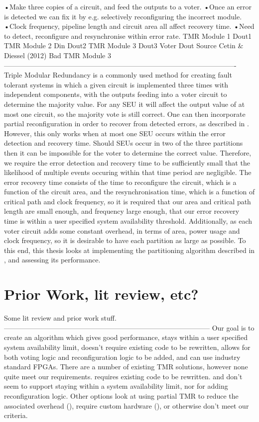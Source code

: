 \documentclass[12pt,draft,a4paper,oneside]{memoir} %
\begin{document}
•Make three copies of a circuit, and feed the outputs to a voter.
•Once an error is detected we can fix it by e.g. selectively reconfiguring the incorrect module.
•Clock frequency, pipeline length and circuit area all affect recovery time.
•Need to detect, reconfigure and resynchronise within error rate.
TMR Module 1
Dout1
TMR Module 2
Din
Dout2
TMR Module 3
Dout3
Voter
Dout
Source Cetin \& Diessel (2012)
Bad
TMR Module 3
----------------------------------------------------------------------------------------------------
Triple Modular Redundancy is a commonly used method for creating fault tolerant systems in which a given circuit is implemented three times with independent components, with the outputs feeding into a voter circuit to determine the majority value. For any \ac{SEU} it will affect the output value of at most one circuit, so the majority vote is still correct. One can then incorporate partial reconfiguration in order to recover from detected errors, as described in . However, this only works when at most one \ac{SEU} occurs within the error detection and recovery time. Should \acp{SEU} occur in two of the three partitions then it can be impossible for the voter to determine the correct value. Therefore, we require the error detection and recovery time to be sufficiently small that the likelihood of multiple events occuring within that time period are negligible.
The error recovery time consists of the time to reconfigure the circuit, which is a function of the circuit area, and the resynchronisation time, which is a function of critical path and clock frequency, so it is required that our area and critical path length are small enough, and frequency large enough, that our error recovery time is within a user specified system availability threshold.
Additionally, as each voter circuit adds some constant overhead, in terms of area, power usage and clock frequency, so it is desirable to have each partition as large as possible. To this end, this thesis looks at implementing the partitioning algorithm described in , and assessing its performance.
\section{Prior Work, lit review, etc?}
Some lit review and prior work stuff.
-----------------------------------------------------------------------------------------
Our goal is to create an algorithm which gives good performance, stays within a user specified system availability limit, doesn't require existing code to be rewritten, allows for both voting logic and reconfiguration logic to be added, and can use industry standard \acp{FPGA}. There are a number of existing \ac{TMR} solutions, however none quite meet our requirements.
\cite{ftmr} requires existing code to be rewritten.
\cite{synplify} and \cite{tmrtool} don't seem to support staying within a system availability limit, nor for adding reconfiguration logic.
Other options look at using partial \ac{TMR} to reduce the associated overhead (\cite{partialTMR}), require custom hardware (\cite{milVTMR}), or otherwise don't meet our criteria.
\end{document}
